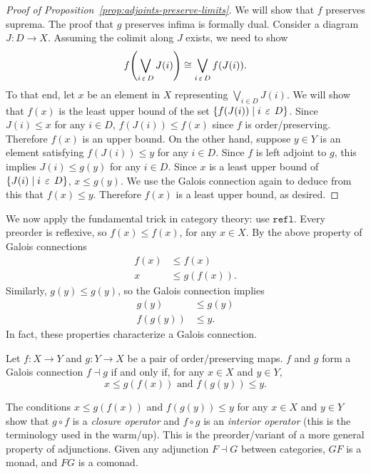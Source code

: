 \documentclass{../thesis-note}
\begin{document}
\begin{proof}[Proof of Proposition~\ref{prop:adjoints-preserve-limits}]
  We will show that \(f\) preserves suprema. The proof that \(g\) preserves
  infima is formally dual. Consider a diagram \(J : D \to
  X\). Assuming the colimit along \(J\) exists, we need to show
  \[%
    f\pwrap{ \bigvee_{i \in D} J(i) } \cong \bigvee_{i \in D} f(J(i)).
  \]%
  To that end, let \(x\) be an element in \(X\) representing \(\bigvee_{i \in D}
  J(i)\). We will show that \(f(x)\) is the least upper bound of the set
  \({\left\{ f(J(i)) \mid i \mathrel{\,\varepsilon\,} D \right\}}\). Since \(J(i) \leq x\) for any \(i \in D\),
  \(f(J(i)) \leq f(x)\) since \(f\) is order\-/preserving. Therefore \(f(x)\) is
  an upper bound. On the other hand, suppose \(y \in Y\) is an element
  satisfying \(f(J(i)) \leq y\) for any \(i \in D\). Since \(f\) is left adjoint
  to \(g\), this implies \(J(i) \leq g(y)\) for any \(i \in D\). Since \(x\) is
  a least upper bound of \({\left\{J(i) \mid i \mathrel{\,\varepsilon\,} D\right\}}\), \(x \leq g(y)\). We use
  the Galois connection again to deduce from this that \(f(x) \leq
  y\). Therefore \(f(x)\) is a least upper bound, as desired.
\end{proof}
We now apply the fundamental trick in category theory: use
\(\texttt{refl}\). Every preorder is reflexive, so \(f(x) \leq f(x)\), for any
\(x \in X\). By the above property of Galois connections
\[%
  \begin{array}{rl}
    f(x) &\leq f(x) \\\hline
    x &\leq g(f(x)).
  \end{array}
\]%
Similarly, \(g(y) \leq g(y)\), so the Galois connection implies
\[%
  \begin{array}{rl}
    g(y) &\leq g(y) \\\hline
    f(g(y)) &\leq y.
  \end{array}
\]%
In fact, these properties characterize a Galois connection.
\begin{theorem}\label{thm:galois-connection-closure}
  Let \(f: X \to Y\) and \(g: Y \to X\) be a pair of order\-/preserving
  maps. \(f\) and \(g\) form a Galois connection \(f \dashv g\) if and only if,
  for any \(x \in X\) and \(y \in Y\),
  \[%
    x \leq g(f(x)) \text{ and } f(g(y)) \leq y.
  \]%
\end{theorem}
\begin{warning_box*}
  The conditions \(x \leq g(f(x))\) and \(f(g(y)) \leq y\) for any \(x \in X\)
  and \(y \in Y\) show that \(g \circ f\) is a \emph{closure operator} and \(f
  \circ g\) is an \emph{interior operator} (this is the terminology used in the
  warm\-/up). This is the preorder\-/variant of a more general property of
  adjunctions. Given any adjunction \(F \dashv G\) between categories, \(GF\) is
  a monad, and \(FG\) is a comonad.
\end{warning_box*}
\end{document}
